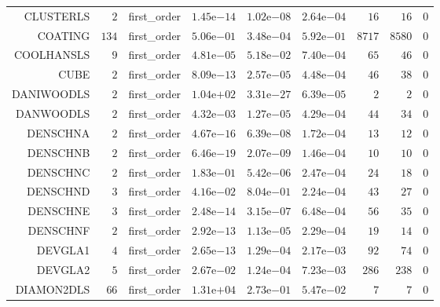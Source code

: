 \begin{longtable}{rrrrrrrrr}
CLUSTERLS & \(     2\) & first\_order & \( 1.45\)e\(-14\) & \( 1.02\)e\(-08\) & \( 2.64\)e\(-04\) & \(    16\) & \(    16\) & \(     0\) \\
COATING & \(   134\) & first\_order & \( 5.06\)e\(-01\) & \( 3.48\)e\(-04\) & \( 5.92\)e\(-01\) & \(  8717\) & \(  8580\) & \(     0\) \\
COOLHANSLS & \(     9\) & first\_order & \( 4.81\)e\(-05\) & \( 5.18\)e\(-02\) & \( 7.40\)e\(-04\) & \(    65\) & \(    46\) & \(     0\) \\
CUBE & \(     2\) & first\_order & \( 8.09\)e\(-13\) & \( 2.57\)e\(-05\) & \( 4.48\)e\(-04\) & \(    46\) & \(    38\) & \(     0\) \\
DANIWOODLS & \(     2\) & first\_order & \( 1.04\)e\(+02\) & \( 3.31\)e\(-27\) & \( 6.39\)e\(-05\) & \(     2\) & \(     2\) & \(     0\) \\
DANWOODLS & \(     2\) & first\_order & \( 4.32\)e\(-03\) & \( 1.27\)e\(-05\) & \( 4.29\)e\(-04\) & \(    44\) & \(    34\) & \(     0\) \\
DENSCHNA & \(     2\) & first\_order & \( 4.67\)e\(-16\) & \( 6.39\)e\(-08\) & \( 1.72\)e\(-04\) & \(    13\) & \(    12\) & \(     0\) \\
DENSCHNB & \(     2\) & first\_order & \( 6.46\)e\(-19\) & \( 2.07\)e\(-09\) & \( 1.46\)e\(-04\) & \(    10\) & \(    10\) & \(     0\) \\
DENSCHNC & \(     2\) & first\_order & \( 1.83\)e\(-01\) & \( 5.42\)e\(-06\) & \( 2.47\)e\(-04\) & \(    24\) & \(    18\) & \(     0\) \\
DENSCHND & \(     3\) & first\_order & \( 4.16\)e\(-02\) & \( 8.04\)e\(-01\) & \( 2.24\)e\(-04\) & \(    43\) & \(    27\) & \(     0\) \\
DENSCHNE & \(     3\) & first\_order & \( 2.48\)e\(-14\) & \( 3.15\)e\(-07\) & \( 6.48\)e\(-04\) & \(    56\) & \(    35\) & \(     0\) \\
DENSCHNF & \(     2\) & first\_order & \( 2.92\)e\(-13\) & \( 1.13\)e\(-05\) & \( 2.29\)e\(-04\) & \(    19\) & \(    14\) & \(     0\) \\
DEVGLA1 & \(     4\) & first\_order & \( 2.65\)e\(-13\) & \( 1.29\)e\(-04\) & \( 2.17\)e\(-03\) & \(    92\) & \(    74\) & \(     0\) \\
DEVGLA2 & \(     5\) & first\_order & \( 2.67\)e\(-02\) & \( 1.24\)e\(-04\) & \( 7.23\)e\(-03\) & \(   286\) & \(   238\) & \(     0\) \\
DIAMON2DLS & \(    66\) & first\_order & \( 1.31\)e\(+04\) & \( 2.73\)e\(-01\) & \( 5.47\)e\(-02\) & \(     7\) & \(     7\) & \(     0\) \\

\end{longtable}

